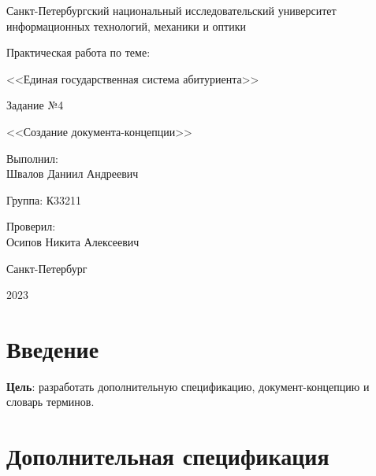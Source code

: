 \documentclass[a4paper, 14pt]{extarticle}
\begin{document}
\begin{titlepage}
  \vspace{0pt plus2fill}
  \noindent

  \vspace{0pt plus6fill}
  \begin{center}
    Санкт-Петербургский национальный исследовательский университет
    информационных технологий, механики и оптики

    \vspace{0pt plus2fill}

    Практическая работа по теме:

    <<Единая государственная система абитуриента>>

    \vspace{0pt plus1fill}

    Задание №4

    <<Создание документа-концепции>>

  \end{center}

  \vspace{0pt plus7fill}
  \begin{flushright}
    Выполнил: \\
    Швалов Даниил Андреевич

    Группа: К33211

    Проверил: \\
    Осипов Никита Алексеевич
  \end{flushright}

  \vspace{0pt plus2fill}
  \begin{center}
    Санкт-Петербург

    2023
  \end{center}
\end{titlepage}

\setcounter{page}{2}

\section{Введение}

\textbf{Цель}: разработать дополнительную спецификацию, документ-концепцию и
словарь терминов.

\section{Дополнительная спецификация}

\end{document}
